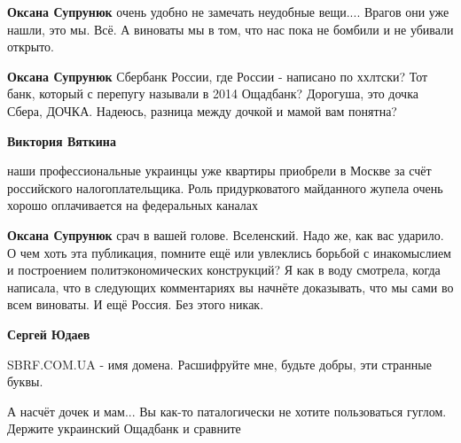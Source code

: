 \begin{itemize}
\begin{itemize}
\textbf{Оксана Супрунюк} очень удобно не замечать неудобные вещи.... Врагов они уже нашли, это мы. Всё. А виноваты мы в том, что нас пока не бомбили и не убивали открыто.

 
\textbf{Оксана Супрунюк} Сбербанк России, где России - написано по ххлтски? Тот банк, который с перепугу называли в 2014 Ощадбанк? Дорогуша, это дочка Сбера, ДОЧКА. Надеюсь, разница между дочкой и мамой вам понятна?

 
\textbf{Виктория Вяткина} 

наши профессиональные украинцы уже квартиры приобрели в Москве за счёт
российского налогоплательщика. Роль придурковатого майданного жупела очень
хорошо оплачивается на федеральных каналах


 
\textbf{Оксана Супрунюк} срач в вашей голове. Вселенский. Надо же, как вас
ударило. О чем хоть эта публикация, помните ещё или увлеклись борьбой с
инакомыслием и построением политэкономических конструкций? Я как в воду
смотрела, когда написала, что в следующих комментариях вы начнёте доказывать,
что мы сами во всем виноваты. И ещё Россия. Без этого никак.

 
\textbf{Сергей Юдаев} 

SBRF.COM.UA - имя домена. Расшифруйте мне, будьте добры, эти странные буквы.

А насчёт дочек и мам... Вы как-то паталогически не хотите пользоваться гуглом.
Держите украинский Ощадбанк и сравните


\end{itemize}
\end{itemize}
